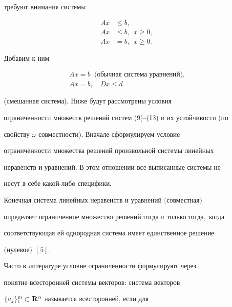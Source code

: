 требуют внимания системы


\begin{align}


Ax&\leq b,\\


Ax&\leq b,\ \; x\geq 0,\\


Ax&=b,\ \; x\geq 0.


\end{align}


Добавим к ним


\begin{gather}


Ax=b\ \text{ (обычная система уравнений),}\\


Ax=b,\quad Dx\leq d


\end{gather}


(смешанная система). Ниже будут рассмотрены условия


ограниченности множеств решений систем (9)--(13) и их устойчивости (по


свойству $\omega$ совместности). Вначале сформулируем условие


ограниченности множества решений произвольной системы линейных


неравенств и уравнений. В этом отношении все выписанные системы не


несут в себе какой-либо специфики.





\begin{thm}


Конечная система линейных неравенств и уравнений $($совместная$)$


определяет ограниченное множество решений тогда и только тогда,\ когда


соответствующая ей однородная система имеет единственное решение


$($нулевое$)$~$[5]$.


\end{thm}





Часто в литературе условие ограниченности формулируют через


понятие всесторонней системы векторов: система векторов


$\{a_j\}_1^m\subset\bold R^n$ называется всесторонней, если для


